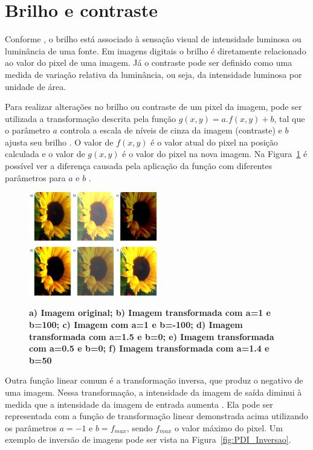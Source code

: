 \documentclass[12pt,oneside,a4paper,english,french,spanish,brazil,]{abntex2}
\begin{document}
\section{Brilho e contraste}

Conforme \citet{pedrini:2008}, o brilho está associado à sensação visual de intensidade luminosa ou luminância de uma fonte. Em imagens digitais o brilho é diretamente relacionado ao valor do pixel de uma imagem. Já o contraste pode ser definido como uma medida de variação relativa da luminância, ou seja, da intensidade luminosa por unidade de área.

Para realizar alterações no brilho ou contraste de um pixel da imagem, pode ser utilizada a transformação descrita pela função \(g(x,y)=a.f(x,y)+b\), tal que o parâmetro \(a\) controla a escala de níveis de cinza da imagem (contraste) e \(b\) ajusta seu brilho \cite{pedrini:2008}. O valor de \(f(x,y)\) é o valor atual do pixel na posição calculada e o valor de \(g(x,y)\) é o valor do pixel na nova imagem. Na Figura~\ref{fig:PDI_Brilho_e_Contraste} é possível ver a diferença causada pela aplicação da função com diferentes parâmetros para \(a\) e \(b\) \cite{pedrini:2008}.

\begin{figure}[ht]
\centering
\caption{\textbf{a) Imagem original; b) Imagem transformada com a=1 e b=100; c) Imagem com a=1 e b=-100; d) Imagem transformada com a=1.5 e b=0; e) Imagem transformada com a=0.5 e b=0; f) Imagem transformada com a=1.4 e b=50}}
\includegraphics[width=0.5\textwidth]{imagens/PDI_Brilho_e_Contraste.pdf}
\sourceAuthor
\label{fig:PDI_Brilho_e_Contraste}
\end{figure}

Outra função linear comum é a transformação inversa, que produz o negativo de uma imagem. Nessa transformação, a intensidade da imagem de saída diminui à medida que a intensidade da imagem de entrada aumenta \cite{pedrini:2008}. Ela pode ser representada com a função de transformação linear demonstrada acima utilizando os parâmetros \(a=-1\) e \(b=f_{max}\), sendo \(f_{max}\) o valor máximo do pixel. Um exemplo de inversão de imagens pode ser vista na Figura~\ref{fig:PDI_Inversao}.
\end{document}
